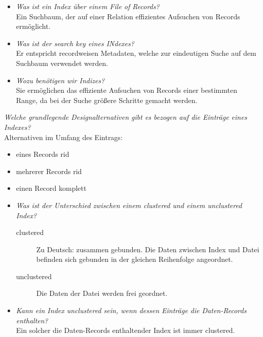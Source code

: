 \documentclass{uni_tue_template}
\begin{document}
\exercise{}
  \item \begin{itemize}
    \item \emph{Was ist ein Index über einem File of Records?}\\
    Ein Suchbaum, der auf einer Relation effizientes Aufsuchen von Records ermöglicht.
    \item \emph{Was ist der search key eines INdexes?}\\
    Er entspricht recordweisen Metadaten, welche zur eindeutigen Suche auf dem Suchbaum verwendet werden. 
    \item \emph{Wozu benötigen wir Indizes?}\\
    Sie ermöglichen das effiziente Aufsuchen von Records einer bestimmten Range, da bei der Suche größere Schritte gemacht werden.
    \end{itemize}
  \item \emph{Welche grundlegende Designalternativen gibt es bezogen auf die Einträge eines Indexes?}\\
    Alternativen im Umfang des Eintrags:
    \begin{itemize}
    \item eines Records rid
    \item mehrerer Records rid
    \item einen Record komplett
    \end{itemize}
  \item \begin{itemize}
    \item \emph{Was ist der Unterschied zwischen einem clustered und einem unclustered Index?}
    \begin{description}
    \item[clustered] Zu Deutsch: zusammen gebunden. Die Daten zwischen Index und Datei befinden sich gebunden in der gleichen Reihenfolge angeordnet.
    \item[unclustered] Die Daten der Datei werden frei geordnet.
    \end{description}
    \item \emph{Kann ein Index unclustered sein, wenn dessen Einträge die Daten-Records enthalten?}\\
    Ein solcher die Daten-Records enthaltender Index ist immer clustered.
  \end{itemize}
\subExEnd{}
%
\newpage 
%
\exercise{}
%
\newpage 
%
\exercise{}
\end{document}

